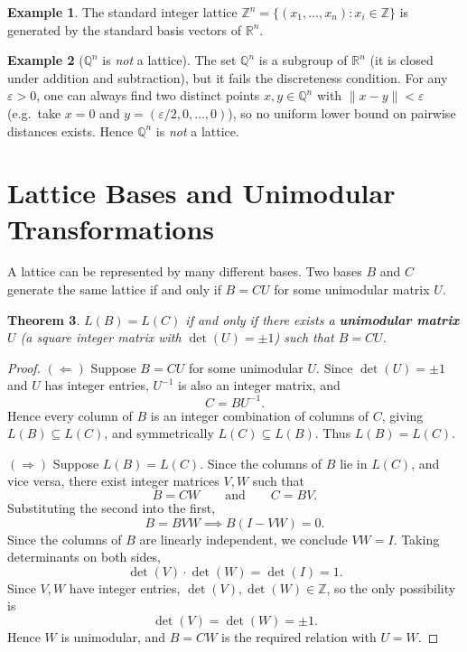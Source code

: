 \documentclass[11pt]{article}
\theoremstyle{plain}
\newtheorem{theorem}{Theorem}[section]
\theoremstyle{definition}
\newtheorem{example}[theorem]{Example}
\newcommand{\Z}{\mathbb{Z}}
\newcommand{\R}{\mathbb{R}}
\newcommand{\Q}{\mathbb{Q}}
\begin{document}
\begin{example}
The standard integer lattice $\Z^n = \{(x_1,\dots,x_n) : x_i \in \Z\}$ is generated by the standard basis vectors of $\R^n$.
\end{example}

\begin{example}[$\Q^n$ is \emph{not} a lattice]
The set $\Q^n$ is a subgroup of $\R^n$ (it is closed under addition and subtraction), but it fails the discreteness condition. For any $\varepsilon > 0$, one can always find two distinct points $x, y \in \Q^n$ with $\|x - y\| < \varepsilon$ (e.g.\ take $x = 0$ and $y = (\varepsilon/2, 0, \ldots, 0)$), so no uniform lower bound on pairwise distances exists. Hence $\Q^n$ is \emph{not} a lattice.
\end{example}

\section{Lattice Bases and Unimodular Transformations}

A lattice can be represented by many different bases. Two bases $B$ and $C$ generate the same lattice if and only if $B = CU$ for some unimodular matrix $U$.

\begin{theorem}
$L(B) = L(C)$ if and only if there exists a \textbf{unimodular matrix} $U$ (a square integer matrix with $\det(U) = \pm 1$) such that $B = CU$.
\end{theorem}

\begin{proof}
$(\Leftarrow)$ Suppose $B = CU$ for some unimodular $U$. Since $\det(U) = \pm 1$ and $U$ has integer entries, $U^{-1}$ is also an integer matrix, and
\[
  C = BU^{-1}.
\]
Hence every column of $B$ is an integer combination of columns of $C$, giving $L(B) \subseteq L(C)$, and symmetrically $L(C) \subseteq L(B)$. Thus $L(B) = L(C)$.

\medskip
$(\Rightarrow)$ Suppose $L(B) = L(C)$. Since the columns of $B$ lie in $L(C)$, and vice versa, there exist integer matrices $V, W$ such that
\[
  B = CW \qquad \text{and} \qquad C = BV.
\]
Substituting the second into the first,
\[
  B = BVW \implies B(I - VW) = 0.
\]
Since the columns of $B$ are linearly independent, we conclude $VW = I$. Taking determinants on both sides,
\[
  \det(V) \cdot \det(W) = \det(I) = 1.
\]
Since $V, W$ have integer entries, $\det(V), \det(W) \in \Z$, so the only possibility is
\[
  \det(V) = \det(W) = \pm 1.
\]
Hence $W$ is unimodular, and $B = CW$ is the required relation with $U = W$. \qedhere
\end{proof}
\end{document}
